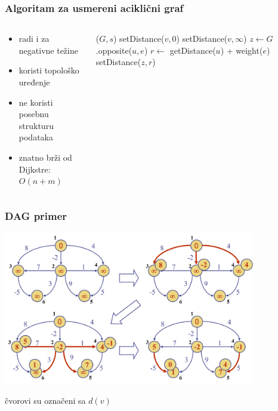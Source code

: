 \documentclass[compress,aspectratio=169]{beamer}
\begin{document}
\begin{frame}[fragile,shrink=2]
  \frametitle{Algoritam za usmereni aciklični graf}
  \begin{columns}
    \begin{column}[t]{5cm}
      \begin{itemize}
        \item radi i za negativne težine
        \item koristi topološko uređenje
        \item ne koristi posebnu strukturu podataka
        \item znatno brži od Dijkstre: $O(n+m)$
      \end{itemize}
    \end{column}
    \begin{column}[t]{7cm}{\small
      \begin{algorithmic}
        \STATE {}($G,s$)
            \STATE setDistance($v,0$)
          \ELSE
            \STATE setDistance($v,\infty$)
          \ENDIF
        \ENDFOR
        \STATE {}
          \STATE {}
            \STATE {}
            \STATE $z \leftarrow G$.opposite($u,e$)
            \STATE $r \leftarrow$ getDistance($u$) + weight($e$)
              \STATE setDistance($z,r$)
            \ENDIF
          \ENDFOR
        \ENDFOR
      \end{algorithmic}}
    \end{column}
  \end{columns}
\end{frame}

\begin{frame}[fragile]
  \frametitle{DAG primer}
  \begin{center}
    \includegraphics[width=11cm]{asp-14-pic67.png}
  \end{center}
  \hfill {\scriptsize čvorovi su označeni sa $d(v)$}
\end{frame}
\end{document}

